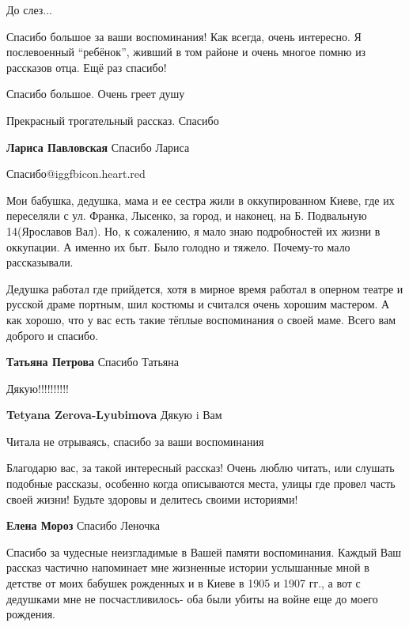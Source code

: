 \begin{itemize}
До слез...


Спасибо большое за ваши воспоминания! Как всегда, очень интересно. Я
послевоенный \enquote{ребёнок}, живший в том районе и очень многое помню из рассказов
отца. Ещё раз спасибо!


Спасибо большое. Очень греет душу

Прекрасный трогательный рассказ. Спасибо

\textbf{Лариса Павловская} Спасибо Лариса

Спасибо@igg{fbicon.heart.red}


Мои бабушка, дедушка, мама и ее сестра жили в оккупированном Киеве, где их
переселяли с ул. Франка, Лысенко, за город, и наконец, на Б. Подвальную
14(Ярославов Вал). Но, к сожалению, я мало знаю подробностей их жизни в
оккупации. А именно их быт. Было голодно и тяжело. Почему-то мало рассказывали.

Дедушка работал где прийдется, хотя в мирное время работал в оперном театре и
русской драме портным, шил костюмы и считался очень хорошим мастером. А как
хорошо, что у вас есть такие тёплые воспоминания о своей маме. Всего вам
доброго и спасибо.


\textbf{Татьяна Петрова} Спасибо Татьяна

Дякую!!!!!!!!!!

\textbf{Tetyana Zerova-Lyubimova} Дякую i Вам

Читала не отрываясь, спасибо за ваши воспоминания


Благодарю вас, за такой интересный рассказ! Очень люблю читать, или слушать
подобные рассказы, особенно когда описываются места, улицы где провел часть
своей жизни! Будьте здоровы и делитесь своими историями!

\textbf{Елена Мороз} Спасибо Леночка


Спасибо за чудесные неизгладимые в Вашей памяти воспоминания. Каждый Ваш
рассказ частично напоминает мне жизненные истории услышанные мной в детстве от
моих бабушек рожденных и в Киеве в 1905 и 1907 гг., а вот с дедушками мне не
посчастливилось- оба были убиты на войне еще до моего рождения.


\end{itemize}
